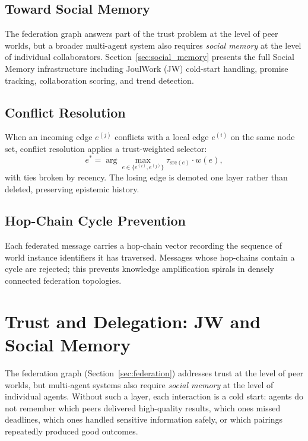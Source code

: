 \documentclass[11pt]{article}
\begin{document}
\subsection{Toward Social Memory}

The federation graph answers part of the trust problem at the level of peer
worlds, but a broader multi-agent system also requires \emph{social memory} at
the level of individual collaborators. Section~\ref{sec:social_memory} presents
the full Social Memory infrastructure including JoulWork (JW) cold-start
handling, promise tracking, collaboration scoring, and trend detection.

\subsection{Conflict Resolution}

When an incoming edge $e^{(j)}$ conflicts with a local edge $e^{(i)}$ on the
same node set, conflict resolution applies a trust-weighted selector:
\begin{equation}
  e^* = \arg\max_{e \in \{e^{(i)}, e^{(j)}\}} \tau_{\text{src}(e)} \cdot w(e),
  \label{eq:conflict}
\end{equation}
with ties broken by recency. The losing edge is demoted one layer rather than
deleted, preserving epistemic history.

\subsection{Hop-Chain Cycle Prevention}

Each federated message carries a hop-chain vector recording the sequence of
world instance identifiers it has traversed. Messages whose hop-chains contain
a cycle are rejected; this prevents knowledge amplification spirals in densely
connected federation topologies.

\section{Trust and Delegation: JW and Social Memory}
\nopagebreak[4]
\label{sec:social_memory}

The federation graph (Section~\ref{sec:federation}) addresses trust at the level
of peer worlds, but multi-agent systems also require \emph{social memory} at
the level of individual agents. Without such a layer, each interaction is a
cold start: agents do not remember which peers delivered high-quality results,
which ones missed deadlines, which ones handled sensitive information safely, or
which pairings repeatedly produced good outcomes.
\end{document}
